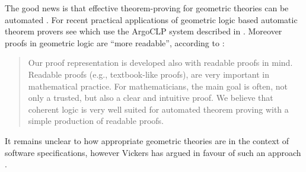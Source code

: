 \documentclass[english,letter paper,12pt,reqno]{article}
\theoremstyle{example}
\begin{document}
The good news is that effective theorem-proving for geometric theories can be automated \cite{bezem, bezem2, bezem3, fisher, holen, nivelle, stojanovic}. For recent practical applications of geometric logic based automatic theorem provers see \cite{marinkovic, durdevic} which use the ArgoCLP system described in \cite{stojanovic}. Moreover proofs in geometric logic are ``more readable'', according to \cite{stojanovic2}:
\begin{quote}
Our proof representation is developed also with readable proofs in mind.
Readable proofs (e.g., textbook-like proofs), are very important in mathematical
practice. For mathematicians, the main goal is often, not only a trusted, but also
a clear and intuitive proof. We believe that coherent logic is very well suited for
automated theorem proving with a simple production of readable proofs.
\end{quote}
It remains unclear to how appropriate geometric theories are in the context of software specifications, however Vickers has argued in favour of such an approach \cite{vickers1,vickers2}.
\end{document}
